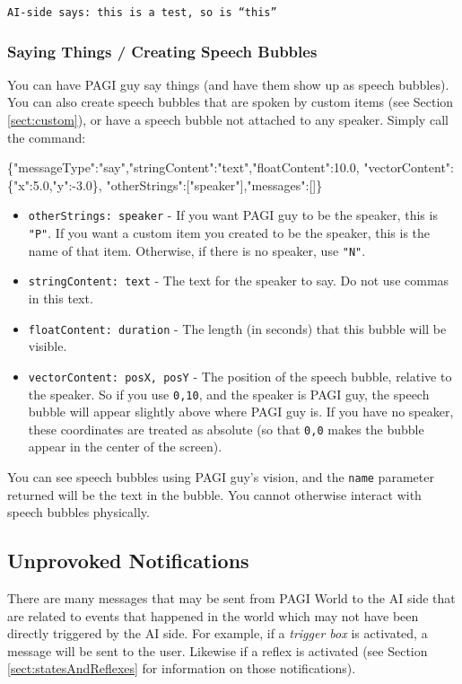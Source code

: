\texttt{AI-side says: this is a test, so is ``this''}

\subsubsection{Saying Things / Creating Speech Bubbles}
\label{sect:speech}

You can have PAGI guy say things (and have them show up as speech bubbles). You can also create speech bubbles that are spoken by custom items (see Section \ref{sect:custom}), or have a speech bubble not attached to any speaker. Simply call the command:

\begin{center}
\scriptsize{\{"messageType":"say","stringContent":"text","floatContent":10.0, "vectorContent":\{"x":5.0,"y":-3.0\},
	 "otherStrings":["speaker"],"messages":[]\}}
\end{center}

\begin{itemize}
\item \texttt{otherStrings: speaker} - If you want PAGI guy to be the speaker, this is \texttt{"P"}. If you want a custom item you created to be the speaker, this is the name of that item. Otherwise, if there is no speaker, use \texttt{"N"}.
\item \texttt{stringContent: text} - The text for the speaker to say. Do not use commas in this text.
\item \texttt{floatContent: duration} - The length (in seconds) that this bubble will be visible.
\item \texttt{vectorContent: posX, posY} - The position of the speech bubble, relative to the speaker. So if you use \texttt{0,10}, and the speaker is PAGI guy, the speech bubble will appear slightly above where PAGI guy is. If you have no speaker, these coordinates are treated as absolute (so that \texttt{0,0} makes the bubble appear in the center of the screen).
\end{itemize}

You can see speech bubbles using PAGI guy's vision, and the \texttt{name} parameter returned will be the text in the bubble. You cannot otherwise interact with speech bubbles physically.

\subsection{Unprovoked Notifications}

There are many messages that may be sent from PAGI World to the AI side that are related to events that happened in the world which may not have been directly triggered by the AI side. For example, if a \textit{trigger box} is activated, a message will be sent to the user. Likewise if a reflex is activated (see Section \ref{sect:statesAndReflexes} for information on those notifications). 


